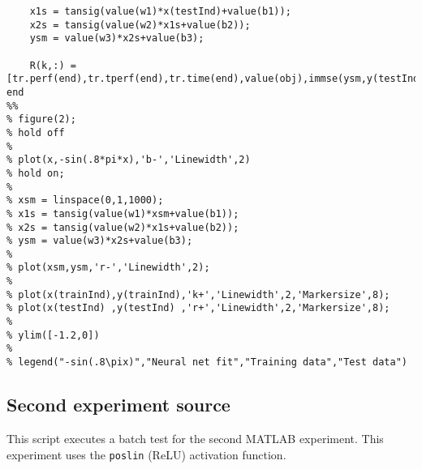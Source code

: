 \begin{verbatim}
    x1s = tansig(value(w1)*x(testInd)+value(b1));
    x2s = tansig(value(w2)*x1s+value(b2));
    ysm = value(w3)*x2s+value(b3);
    
    R(k,:) = [tr.perf(end),tr.tperf(end),tr.time(end),value(obj),immse(ysm,y(testInd)),t1]
end
%%
% figure(2);
% hold off
% 
% plot(x,-sin(.8*pi*x),'b-','Linewidth',2)
% hold on;
% 
% xsm = linspace(0,1,1000);
% x1s = tansig(value(w1)*xsm+value(b1));
% x2s = tansig(value(w2)*x1s+value(b2));
% ysm = value(w3)*x2s+value(b3);
% 
% plot(xsm,ysm,'r-','Linewidth',2);
% 
% plot(x(trainInd),y(trainInd),'k+','Linewidth',2,'Markersize',8);
% plot(x(testInd) ,y(testInd) ,'r+','Linewidth',2,'Markersize',8);
% 
% ylim([-1.2,0])
% 
% legend("-sin(.8\pix)","Neural net fit","Training data","Test data")
\end{verbatim}

\subsection{Second experiment source}
This script executes a batch test for the second MATLAB experiment. This experiment uses the \texttt{poslin} (ReLU) activation function.
